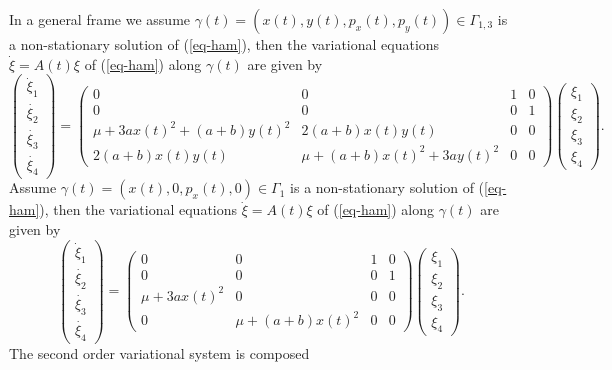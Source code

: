 \documentclass[final]{siamart0516}
\begin{document}
In a general frame we assume $\gamma (t)= (x(t), y(t), p_x(t), p_y(t))\in\Gamma_{1,3}$  is a non-stationary solution of (\ref{eq-ham}), then the variational equations $\dot{\xi}=A(t)\xi$ of
(\ref{eq-ham}) along $\gamma (t)$ are given by
\begin{equation*}
\left( \begin{array}{c}\dot{\xi}_1 \\ \dot{\xi_2} \\ \dot{\xi_3} \\  \dot{\xi_4} \end{array}\right)
=\begin{pmatrix}
0 & 0 & 1 & 0\\ 0 & 0 & 0 & 1\\ \mu + 3ax(t)^2 + (a+b) y(t)^2   & 2(a+b)x(t)y(t) & 0 & 0\\ 
2(a+b)x(t)y(t)  & \mu +(a+b)x(t)^2 + 3a y(t)^2 & 0 & 0
\end{pmatrix}
\left( \begin{array}{c}  \xi_1 \\  \xi_2  \\  \xi_3  \\  \xi_4 \end{array} \right).
\end{equation*}
%
Assume $\gamma (t)= (x(t), 0, p_x(t), 0)\in\Gamma_1$  is a non-stationary solution of (\ref{eq-ham}), then the variational equations $\dot{\xi}=A(t)\xi$ of
(\ref{eq-ham}) along $\gamma (t)$ are given by
\begin{equation*}
\left( \begin{array}{c}\dot{\xi}_1 \\ \dot{\xi_2} \\ \dot{\xi_3} \\  \dot{\xi_4} \end{array}\right)
=\begin{pmatrix}
0 & 0 & 1 & 0\\ 0 & 0 & 0 & 1\\ \mu +3ax(t)^2 & 0 & 0 & 0\\ 0 & \mu +(a+b)x(t)^2 & 0 & 0
\end{pmatrix}
\left( \begin{array}{c}  \xi_1 \\  \xi_2  \\  \xi_3  \\  \xi_4 \end{array} \right).
\end{equation*}
%
The second order variational system is composed 
\end{document}
